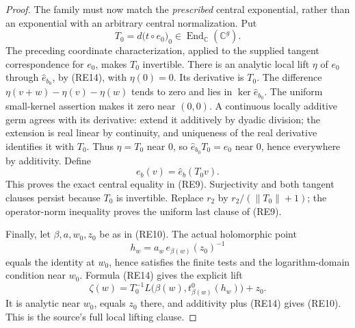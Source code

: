 \begin{proof}
The family must now match the \emph{prescribed} central
exponential, rather than an exponential with an arbitrary
central normalization.
Put
\[
             T_0=d\bigl(t\circ e_0\bigr)_0
                         \in\operatorname{End}_{\mathbb C}(\mathbb C^g).
\]
The preceding coordinate characterization, applied to the
supplied tangent correspondence for \(e_0\), makes \(T_0\)
invertible.
There is an analytic local lift \(\eta\) of \(e_0\)
through \(\widehat e_{b_0}\), by (RE14), with \(\eta(0)=0\).
Its derivative is \(T_0\).
The difference
\(\eta(v+w)-\eta(v)-\eta(w)\) tends to zero and lies in
\(\ker\widehat e_{b_0}\).
The uniform small-kernel assertion makes it zero near
\((0,0)\).
A continuous locally additive germ agrees with its derivative:
extend it additively by dyadic division; the extension is
real linear by continuity, and uniqueness of the real
derivative identifies it with \(T_0\).
Thus \(\eta=T_0\) near \(0\), so
\(\widehat e_{b_0}T_0=e_0\) near \(0\), hence everywhere
by additivity.
Define
\[
                              e_b(v)=\widehat e_b(T_0v).
\]
This proves the exact central equality in (RE9).
Surjectivity and both tangent clauses persist because
\(T_0\) is invertible.
Replace \(r_2\) by \(r_2/(\|T_0\|+1)\); the operator-norm
inequality proves the uniform last clause of (RE9).

Finally, let \(\beta,a,w_0,z_0\) be as in (RE10).
The actual holomorphic point
\[
                     h_w=a_w\,e_{\beta(w)}(z_0)^{-1}
\]
equals the identity at \(w_0\), hence satisfies the finite
tests and the logarithm-domain condition near \(w_0\).
Formula (RE14) gives the explicit lift
\[
 \zeta(w)=T_0^{-1}L\bigl(\beta(w),
                     t_{\beta(w)}^0(h_w)\bigr)+z_0.        \tag{RE16}
\]
It is analytic near \(w_0\), equals \(z_0\) there, and
additivity plus (RE14) gives (RE10).
This is the source's full local lifting clause.
\end{proof}

